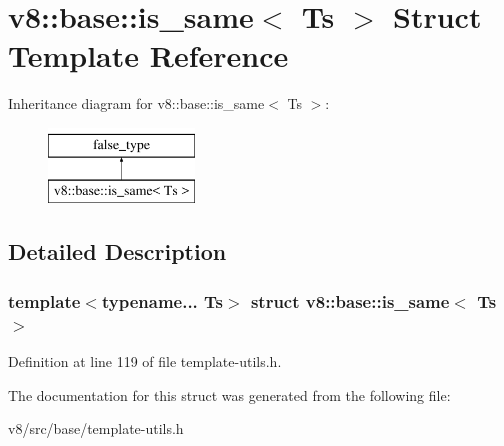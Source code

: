 \hypertarget{structv8_1_1base_1_1is__same}{}\section{v8\+:\+:base\+:\+:is\+\_\+same$<$ Ts $>$ Struct Template Reference}
\label{structv8_1_1base_1_1is__same}
Inheritance diagram for v8\+:\+:base\+:\+:is\+\_\+same$<$ Ts $>$\+:\begin{figure}[H]
\begin{center}
\leavevmode
\includegraphics[height=2.000000cm]{structv8_1_1base_1_1is__same}
\end{center}
\end{figure}


\subsection{Detailed Description}
\subsubsection*{template$<$typename... Ts$>$\newline
struct v8\+::base\+::is\+\_\+same$<$ Ts $>$}



Definition at line 119 of file template-\/utils.\+h.



The documentation for this struct was generated from the following file\+:\begin{DoxyCompactItemize}
\item 
v8/src/base/template-\/utils.\+h\end{DoxyCompactItemize}

